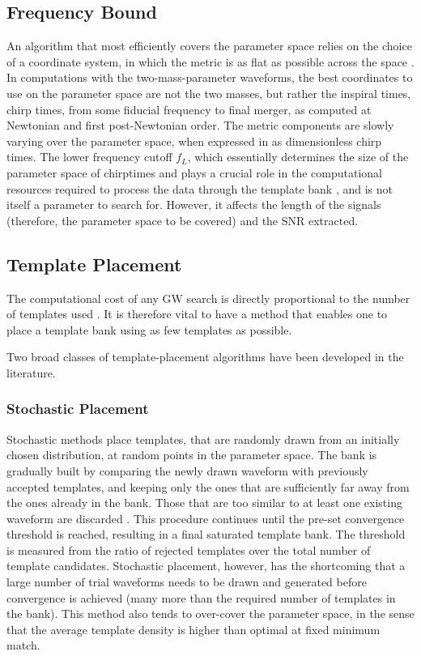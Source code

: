 \documentclass[binding=0.6cm, LaM]{sapthesis}
\begin{document}
\subsection{Frequency Bound}
	An algorithm that most efficiently covers the parameter space relies on the choice of a coordinate system, 
	in which the metric is as flat as possible across the space \cite{34}.
	In computations with the two-mass-parameter waveforms, 
	the best coordinates to use on the parameter space are not the two masses, 
	but rather the inspiral times, chirp times, from some fiducial frequency to final merger, 
	as computed at Newtonian and first post-Newtonian order. 
	The metric components are slowly varying over the parameter space, 
	when expressed in as dimensionless chirp times. 
        The lower frequency cutoff $f_L$, which essentially determines the size of the parameter space
        of chirptimes and plays a crucial role in the computational resources required
        to process the data through the template bank \cite{30}, and is not itself a parameter to search for.
        However, it affects the length of the signals
        (therefore, the parameter space to be covered) and the SNR extracted.

\subsection{Template Placement}
	The computational cost of any GW search
        is directly proportional to the number of templates used \cite{28}.
	It is therefore vital to have a method that enables one 
	to place a template bank using as few templates as possible.

	Two broad classes of template-placement algorithms 
	have been developed in the literature. 

\subsubsection{Stochastic Placement}
	Stochastic methods place templates, 
	that are randomly drawn from an initially chosen distribution, 
	at random points in the parameter space.
	The bank is gradually built by comparing the newly drawn waveform
	with previously accepted templates, 
	and keeping only the ones that are sufficiently far away 
	from the ones already in the bank.
 	Those that are too similar to at least one existing waveform are discarded \cite{35}.
	This procedure continues until the pre-set convergence threshold is reached, 
	resulting in a final saturated template bank.
	The threshold is measured from the ratio of rejected templates over the total number of template candidates.
	Stochastic placement, however, has the shortcoming that 
	a large number of trial waveforms needs to be drawn and generated before convergence is achieved 
	(many more than the required number of templates in the bank). 
	This method also tends to over-cover the parameter space, 
	in the sense that the average template density is higher than optimal at fixed minimum match.
\end{document}
